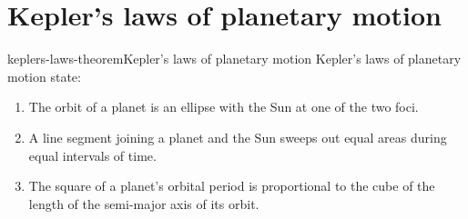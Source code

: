 \documentclass[preview]{standalone}
\begin{document}
\genpage

\section{Kepler's laws of planetary motion}

\begin{snippettheorem}{keplers-laws-theorem}{Kepler's laws of planetary motion}
    Kepler's laws of planetary motion state:
    \begin{enumerate}
        \item The orbit of a planet is an ellipse with the Sun at one of the two foci.
        \item A line segment joining a planet and the Sun sweeps out equal areas during equal intervals of time.
        \item The square of a planet's orbital period is proportional to the cube of the length of the semi-major axis of its orbit.
    \end{enumerate}
\end{snippettheorem}
\end{document}
